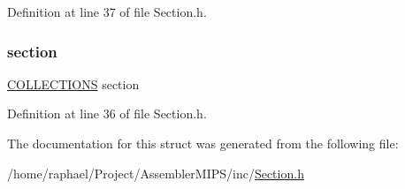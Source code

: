 Definition at line 37 of file Section.\+h.

\mbox{\label{struct_l_a_b_e_l___d_a_t_a_a33bc2666034b9f205e5504b6a929176f}} 
\subsubsection{\texorpdfstring{section}{section}}
{\footnotesize\ttfamily \mbox{\hyperlink{_f_s_m_collection_8h_a25f9142504106abec10ec63d2a9be4cd}{C\+O\+L\+L\+E\+C\+T\+I\+O\+NS}} section}



Definition at line 36 of file Section.\+h.



The documentation for this struct was generated from the following file\+:\begin{DoxyCompactItemize}
\item 
/home/raphael/\+Project/\+Assembler\+M\+I\+P\+S/inc/\mbox{\hyperlink{_section_8h}{Section.\+h}}\end{DoxyCompactItemize}
